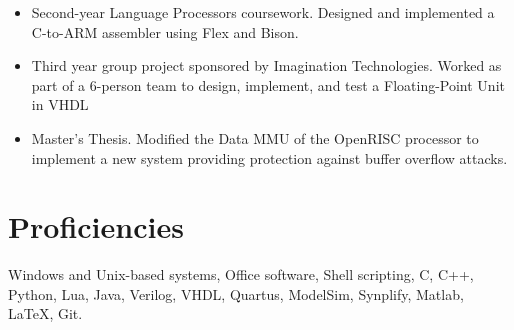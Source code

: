 \documentclass[a4paper, oneside, final]{scrartcl} %
\newif\iftwopage
\begin{document}
\begin{center}
\begin{itemize}
\item
Second-year Language Processors coursework. Designed and implemented a
C-to-ARM assembler using Flex and Bison.

\item
Third year group project sponsored by Imagination Technologies. Worked
as part of a 6-person team to design, implement, and test a
Floating-Point Unit in VHDL

\item
Master's Thesis. Modified the Data MMU of the OpenRISC processor to
implement a new system providing protection against buffer overflow
attacks.
\end{itemize}

\fi

\section{Proficiencies}


\begin{flushleft}
Windows and Unix-based systems, Office software, Shell scripting, C,
C++, Python, Lua, Java, Verilog, VHDL, Quartus, ModelSim, Synplify,
Matlab, \LaTeX, Git.
\end{flushleft}

\iftwopage

\section{Interests}

\begin{flushleft}
Graphics, Artificial Intelligence, FPGA Design, Network Security,
Kendo, Japanese Culture, Video Games
\end{flushleft}

\fi


\end{center}
\end{document}
